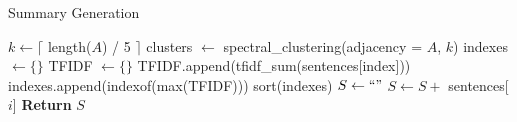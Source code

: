 \begin{algorithm} \caption{Summary Generation} \label{alg:summary}
\begin{algorithmic}[1]
    \State $k \gets \lceil$ length($A$) / 5 $\rceil$
    \State clusters $\gets$ spectral\_clustering(adjacency = $A$, $k$)
    \State indexes $\gets \{\}$
        \State TFIDF $\gets \{\}$
            \State TFIDF.append(tfidf\_sum(sentences[index]))
        \EndFor
        \State indexes.append(indexof(max(TFIDF)))
    \EndFor
    \State sort(indexes)
    \State $S \gets `` "$
        \State $S \gets S +$ sentences[$i$]
    \EndFor
    \State \textbf{Return} $S$
\end{algorithmic}
\end{algorithm}

